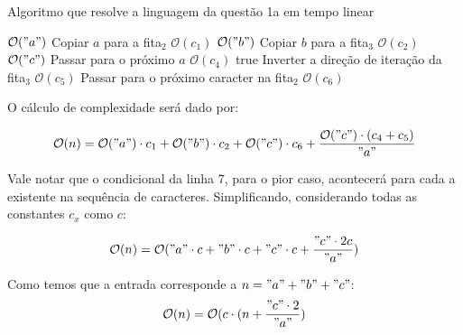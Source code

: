 \documentclass{article}
\begin{document}
\begin{algorithm} 
  \caption{Algoritmo que resolve a linguagem da questão 1a em tempo linear}
\begin{algorithmic}[1]
  \Comment $\mathcal{O}("a")$
    \State Copiar $a$ para a fita$_2$
  \Comment $\mathcal{O}(c_1)$
  \EndFor
  \Comment $\mathcal{O}("b")$
    \State Copiar $b$ para a fita$_3$
  \Comment $\mathcal{O}(c_2)$
  \EndFor
  \Comment $\mathcal{O}("c")$
  \State Passar para o próximo $a$
  \Comment $\mathcal{O}(c_4)$
    \State \Return true
  \EndIf
  \State Inverter a direção de iteração da fita$_3$
  \Comment $\mathcal{O}(c_5)$
  \EndIf
  \State Passar para o próximo caracter na fita$_2$
  \Comment $\mathcal{O}(c_6)$
  \EndFor
\end{algorithmic}
\end{algorithm}

O cálculo de complexidade será dado por:

\begin{align}
  \begin{split}
    \mathcal{O}(n) = \mathcal{O}("a") \cdot c_1 + \mathcal{O}("b") \cdot c_2 + \mathcal{O}("c") \cdot c_6 + \frac{\mathcal{O}("c") \cdot (c_4 + c_5)}{"a"}  \\
\end{split}
\end{align}

Vale notar que o condicional da linha 7, para o pior caso, acontecerá para cada a existente na sequência de caracteres.
Simplificando, considerando todas as constantes $c_x$ como $c$:

\begin{align}
  \begin{split}
    \mathcal{O}(n) = \mathcal{O}("a" \cdot c + "b" \cdot c +"c" \cdot c + \frac{"c" \cdot 2c }{"a"})  \\
\end{split}
\end{align}

Como temos que a entrada corresponde a $n = "a" + "b" + "c"$:
\begin{align}
  \begin{split}
    \mathcal{O}(n) = \mathcal{O}(c \cdot (n + \frac{"c" \cdot 2 }{"a"})  \\
\end{split}
\end{align}
\end{document}
